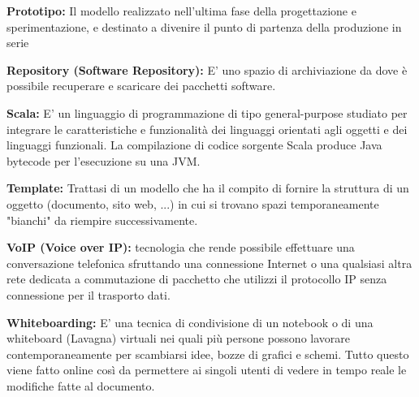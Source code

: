 \documentclass{scalatekids-article}
\begin{document}

\textbf{Prototipo:} Il modello realizzato nell’ultima fase della progettazione e sperimentazione, e destinato a divenire il punto di partenza della produzione in serie



\textbf{Repository (Software Repository):} E' uno spazio di archiviazione da dove è possibile recuperare e scaricare dei pacchetti software.


\textbf{Scala:} E' un linguaggio di programmazione di tipo general-purpose studiato per integrare le caratteristiche e funzionalità dei linguaggi orientati agli oggetti e dei linguaggi funzionali. La compilazione di codice sorgente Scala produce Java bytecode per l'esecuzione su una JVM.


\textbf{Template:} Trattasi di un modello che ha il compito di fornire la struttura di un oggetto (documento, sito web, ...) in cui si trovano spazi temporaneamente "bianchi" da riempire successivamente.



\textbf{VoIP (Voice over IP):} tecnologia che rende possibile effettuare una conversazione telefonica sfruttando una connessione Internet o una qualsiasi altra rete dedicata a commutazione di pacchetto che utilizzi il protocollo IP senza connessione per il trasporto dati.


\textbf{Whiteboarding:} E' una tecnica di condivisione di un notebook o di una whiteboard (Lavagna) virtuali nei quali più persone possono lavorare contemporaneamente per scambiarsi idee, bozze di grafici e schemi.
Tutto questo viene fatto online così da permettere ai singoli utenti di vedere in tempo reale le modifiche fatte al documento.



\end{document}
